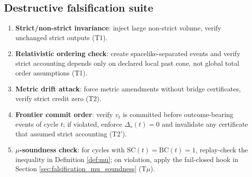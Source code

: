 \documentclass[11pt,a4paper]{article}
\theoremstyle{definition}
\theoremstyle{remark}
\begin{document}
\subsection{Destructive falsification suite}
\begin{enumerate}
  \item \textbf{Strict/non-strict invariance}: inject large non-strict volume, verify unchanged strict outputs (T1).
  \item \textbf{Relativistic ordering check}: create spacelike-separated events and verify strict accounting depends only on declared local past cone, not global total order assumptions (T1).
  \item \textbf{Metric drift attack}: force metric amendments without bridge certificates, verify strict credit zero (T2).
  \item \textbf{Frontier commit order}: verify $v_t$ is committed before outcome-bearing events of cycle $t$; if violated, enforce $\Delta_s(t)=0$ and invalidate any certificate that assumed strict accounting (T2').
  \item \textbf{$\mu$-soundness check}: for cycles with $\mathrm{SC}(t)=\mathrm{BC}(t)=1$, replay-check the inequality in Definition \ref{def:mu}; on violation, apply the fail-closed hook in Section \ref{sec:falsification_mu_soundness} (T$\mu$).


\end{enumerate}
\end{document}
